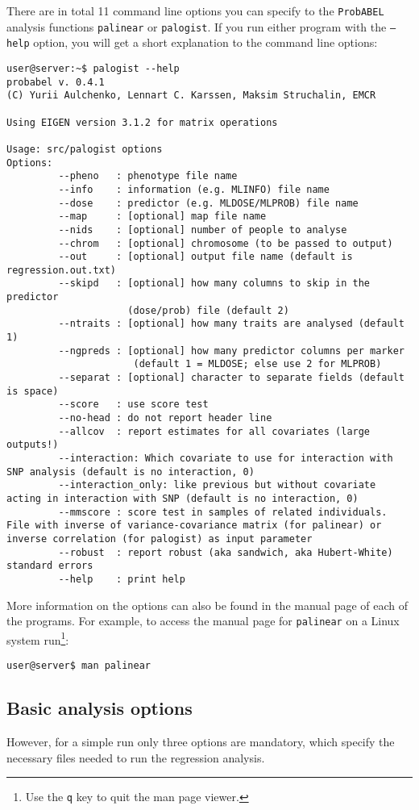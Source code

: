 \documentclass[12pt,a4paper]{article}
\newcommand{\PA}{\texttt{ProbABEL}}
\begin{document}
There are in total 11 command line options you can specify to the
\PA{} analysis functions \texttt{palinear} or \texttt{palogist}. If
you run either program with the \texttt{--help} option, you will get a
short explanation to the command line options:
\begin{verbatim}
user@server:~$ palogist --help
probabel v. 0.4.1
(C) Yurii Aulchenko, Lennart C. Karssen, Maksim Struchalin, EMCR

Using EIGEN version 3.1.2 for matrix operations

Usage: src/palogist options
Options:
         --pheno   : phenotype file name
         --info    : information (e.g. MLINFO) file name
         --dose    : predictor (e.g. MLDOSE/MLPROB) file name
         --map     : [optional] map file name
         --nids    : [optional] number of people to analyse
         --chrom   : [optional] chromosome (to be passed to output)
         --out     : [optional] output file name (default is regression.out.txt)
         --skipd   : [optional] how many columns to skip in the predictor
                     (dose/prob) file (default 2)
         --ntraits : [optional] how many traits are analysed (default 1)
         --ngpreds : [optional] how many predictor columns per marker
                      (default 1 = MLDOSE; else use 2 for MLPROB)
         --separat : [optional] character to separate fields (default is space)
         --score   : use score test
         --no-head : do not report header line
         --allcov  : report estimates for all covariates (large outputs!)
         --interaction: Which covariate to use for interaction with SNP analysis (default is no interaction, 0)
         --interaction_only: like previous but without covariate acting in interaction with SNP (default is no interaction, 0)
         --mmscore : score test in samples of related individuals. File with inverse of variance-covariance matrix (for palinear) or inverse correlation (for palogist) as input parameter
         --robust  : report robust (aka sandwich, aka Hubert-White) standard errors
         --help    : print help
\end{verbatim}
More information on the options can also be found in the manual page
of each of the programs. For example, to access the manual page for
\texttt{palinear} on a Linux system run\footnote{Use the \texttt{q}
  key to quit the man page viewer.}:
\begin{verbatim}
user@server$ man palinear
\end{verbatim}


\subsection{Basic analysis options}
However, for a simple run only three options are mandatory, which
specify the necessary files needed to run the regression analysis.
\end{document}
